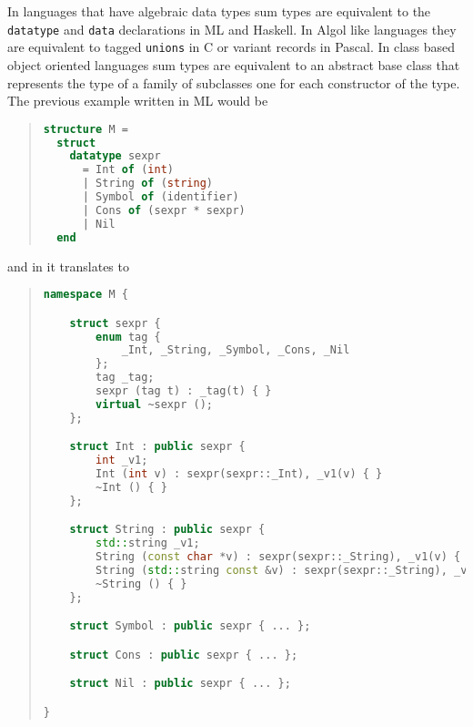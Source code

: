 In languages that have algebraic data types sum types are equivalent to the
\lstinline[language=ASDL]!datatype! and \lstinline[language=ASDL]!data! declarations in ML and Haskell. In Algol like
languages they are equivalent to tagged \lstinline[language=ASDL]!unions! in C or variant records
in Pascal. In class based object oriented languages sum types are equivalent
to an abstract base class that represents the type of a family of subclasses
one for each constructor of the type. The previous example written in ML would
be
\begin{quote}\begin{lstlisting}[language=SML]
structure M =
  struct
    datatype sexpr
      = Int of (int)
      | String of (string)
      | Symbol of (identifier)
      | Cons of (sexpr * sexpr)
      | Nil
  end
\end{lstlisting}\end{quote}%
and in \Cplusplus{} it translates to
\begin{quote}\begin{lstlisting}[language=c++]
namespace M {

    struct sexpr {
        enum tag {
            _Int, _String, _Symbol, _Cons, _Nil
        };
        tag _tag;
        sexpr (tag t) : _tag(t) { }
        virtual ~sexpr ();
    };

    struct Int : public sexpr {
        int _v1;
        Int (int v) : sexpr(sexpr::_Int), _v1(v) { }
        ~Int () { }
    };

    struct String : public sexpr {
        std::string _v1;
        String (const char *v) : sexpr(sexpr::_String), _v1(v) { }
        String (std::string const &v) : sexpr(sexpr::_String), _v1(v) { }
        ~String () { }
    };

    struct Symbol : public sexpr { ... };

    struct Cons : public sexpr { ... };

    struct Nil : public sexpr { ... };

}
\end{lstlisting}\end{quote}%
